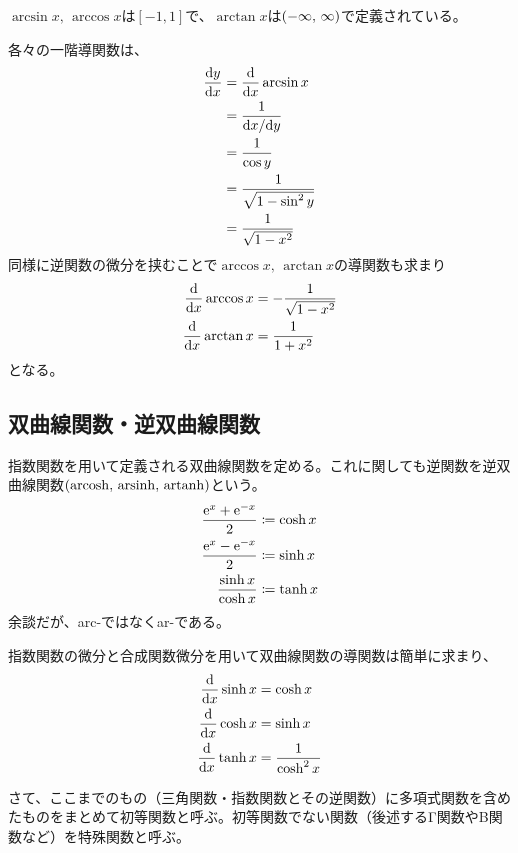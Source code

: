 $\arcsin x,\,\arccos x$は$[-1,1]$で、$\arctan x$は$\pare{-\infty,\,\infty}$で定義されている。

各々の一階導関数は、
\begin{align}
    \begin{aligned}
        \frac{\mathrm{d}y}{\mathrm{d}x} & =\frac{\mathrm{d}}{\mathrm{d}x}\arcsin x        \\
                    & =\frac{1}{\mathrm{d}x/\mathrm{d}y}          \\
                    & =\frac{1}{\cos y}           \\
                    & =\frac{1}{\sqrt{1-\sin^2y}} \\
                    & =\frac{1}{\sqrt{1-x^2}}
    \end{aligned}
\end{align}
同様に逆関数の微分を挟むことで$\arccos x,\,\arctan x$の導関数も求まり
\begin{align}
    \frac{\mathrm{d}}{\mathrm{d}x}\arccos x & =-\frac{1}{\sqrt{1-x^2}} \\
    \frac{\mathrm{d}}{\mathrm{d}x}\arctan x & =\frac{1}{1+x^2}
\end{align}
となる。
\subsection{双曲線関数・逆双曲線関数}
指数関数を用いて定義される双曲線関数を定める。これに関しても逆関数を逆双曲線関数$\pare{\arcosh,\,\arsinh,\,\artanh}$という。
\begin{align}
    \frac{\mathrm{e}^x+\mathrm{e}^{-x}}{2} & \coloneqq\cosh x \\
    \frac{\mathrm{e}^x-\mathrm{e}^{-x}}{2} & \coloneqq\sinh x \\
    \frac{\sinh x}{\cosh x}                & \coloneqq\tanh x
\end{align}
余談だが、arc-ではなくar-である。

指数関数の微分と合成関数微分を用いて双曲線関数の導関数は簡単に求まり、
\begin{align}
    \begin{aligned}
        \frac{\mathrm{d}}{\mathrm{d}x}\sinh x & =\cosh x            \\
        \frac{\mathrm{d}}{\mathrm{d}x}\cosh x & =\sinh x            \\
        \frac{\mathrm{d}}{\mathrm{d}x}\tanh x & =\frac{1}{\cosh^2x}
    \end{aligned}
\end{align}
\baselineskip

さて、ここまでのもの（三角関数・指数関数とその逆関数）に多項式関数を含めたものをまとめて初等関数と呼ぶ。初等関数でない関数（後述するΓ関数やΒ関数など）を特殊関数と呼ぶ。

